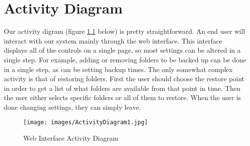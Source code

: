 \chapter{Activity Diagram}

Our activity digram (figure \ref{fig:activitydiagram} below) is pretty straightforward.  An end user will interact with our system mainly through the web interface.  This interface displays all of the controls on a single page, so most settings can be altered in a single step.  For example, adding or removing folders to be backed up can be done in a single step, as can be setting backup times.  The only somewhat complex activity is that of restoring folders.  First the user should choose the restore point in order to get a list of what folders are available from that point in time.  Then the user either selects specific folders or all of them to restore.  When the user is done changing settings, they can simply leave.

\begin{figure}[h]
	\centering

\texttt{[image: images/ActivityDiagram1.jpg]}
	\caption{Web Interface Activity Diagram}
	\label{fig:activitydiagram}
\end{figure}